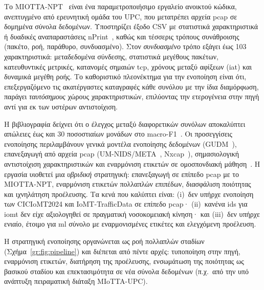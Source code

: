 
Το MIOTTA-NPT~\cite{leon2025miotta, miotta_npt_github} είναι ένα παραμετροποιήσιμο εργαλείο ανοικτού κώδικα, ανεπτυγμένο από ερευνητική ομάδα του UPC, που μετατρέπει αρχεία \gls{pcap} σε δομημένα σύνολα δεδομένων. Υποστηρίζει έξοδο CSV με στατιστικά χαρακτηριστικά ή δυαδικές αναπαραστάσεις nPrint~\cite{holland2021nprint}, καθώς και τέσσερις τρόπους συνάθροισης (πακέτο, ροή, παράθυρο, συνδυασμένο). Στον \textit{συνδυασμένο} τρόπο εξάγει έως 103 χαρακτηριστικά: μεταδεδομένα σύνδεσης, στατιστικά μεγέθους πακέτων, κατευθυντικές μετρικές, κατανομές σημαιών \gls{tcp}, χρόνους μεταξύ αφίξεων (\gls{iat}) και δυναμικά μεγέθη ροής. Το καθοριστικό πλεονέκτημα για την ενοποίηση είναι ότι, επεξεργαζόμενο τις ακατέργαστες καταγραφές κάθε συνόλου με την ίδια διαμόρφωση, παράγει \textit{ταυτόσημους} χώρους χαρακτηριστικών, επιλύοντας την ετερογένεια στην πηγή αντί για εκ των υστέρων αντιστοίχιση.


Η βιβλιογραφία δείχνει ότι ο έλεγχος μεταξύ διαφορετικών συνόλων αποκαλύπτει απώλειες έως και 30 ποσοστιαίων μονάδων στο macro-F1~\cite{abouhouran2025federated}. Οι προσεγγίσεις ενοποίησης περιλαμβάνουν γενικά μοντέλα ενοποίησης δεδομένων (GUDM~\cite{ali2015gudm}), επανεξαγωγή από αρχεία \gls{pcap} (UM-NIDS/META~\cite{khan2024umnids}, Nxcap~\cite{noblet2025nxcap}), σημασιολογική αντιστοίχιση χαρακτηριστικών και εναρμόνιση ετικετών σε ομοσπονδιακή μάθηση~\cite{abouhouran2025federated}. Η εργασία υιοθετεί μια \textit{υβριδική} στρατηγική: επανεξαγωγή σε επίπεδο \gls{pcap} με το MIOTTA-NPT, εναρμόνιση ετικετών πολλαπλών επιπέδων, διασφάλιση ποιότητας και ιχνηλάτηση προέλευσης. Τα κενά που καλύπτει είναι: (i)~δεν υπήρχε ενοποίηση των CICIoMT2024 και IoMT-TrafficData σε επίπεδο \gls{pcap}· (ii)~κανένα \gls{ids} για \gls{iomt} δεν είχε αξιολογηθεί σε πραγματική νοσοκομειακή κίνηση· και (iii)~δεν υπήρχε ενιαίο, έτοιμο για \gls{ml} σύνολο με εναρμονισμένες ετικέτες και ελεγχόμενη προέλευση.


Η στρατηγική ενοποίησης οργανώνεται ως ροή πολλαπλών σταδίων (Σχήμα~\ref{gr:fig:pipeline}) και διέπεται από πέντε αρχές: τυποποίηση στην πηγή, εναρμόνιση ετικετών, διατήρηση της προέλευσης, ενσωμάτωση της ποιότητας ως βασικού σταδίου και επεκτασιμότητα σε νέα σύνολα δεδομένων (π.χ.\ από την υπό ανάπτυξη πειραματική διάταξη MIoTTA-UPC).

